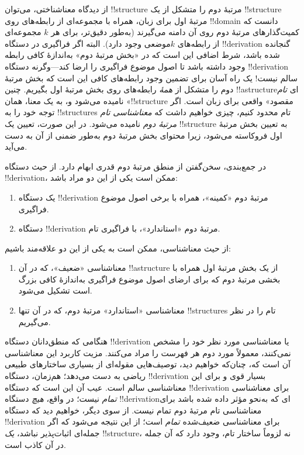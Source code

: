 \documentclass[../../../include/open-logic-section]{subfiles}
\begin{document}
از دیدگاه معناشناختی، می‌توان !!{structure} مرتبهٔ دوم را متشکل از یک
!!{structure} مرتبهٔ اول برای زبان، همراه با مجموعه‌ای از رابطه‌های روی
!!{domain} دانست که کمیت‌گذارهای مرتبهٔ دوم روی آن دامنه می‌گیرند
(به‌طور دقیق‌تر، برای هر $k$ مجموعه‌ای از رابطه‌های $k$موضعی وجود
دارد). البته اگر فراگیری در دستگاه !!{derivation} گنجانده شده باشد، شرط
اضافی این است که در «بخش مرتبهٔ دوم» به‌اندازهٔ کافی رابطه وجود داشته
باشد تا اصول موضوع فراگیری را ارضا کند---وگرنه دستگاه !!{derivation}
سالم نیست!{} یک راه آسان برای تضمین وجود رابطه‌های کافی این است که بخش
مرتبهٔ دوم را متشکل از \emph{همهٔ} رابطه‌های روی بخش مرتبهٔ اول بگیریم.
چنین !!a{structure}ای \emph{تام} نامیده می‌شود و، به یک معنا، همان
«!!{structure} مقصود» واقعی برای زبان است. اگر توجه خود را به
!!{structure}s تام محدود کنیم، چیزی خواهیم داشت که \emph{معناشناسی
تام مرتبهٔ دوم} نامیده می‌شود. در این صورت، تعیین یک !!{structure} به
تعیین بخش مرتبهٔ اول فروکاسته می‌شود، زیرا محتوای بخش مرتبهٔ دوم
به‌طور ضمنی از آن به دست می‌آید.

در جمع‌بندی، سخن‌گفتن از منطق مرتبهٔ دوم قدری ابهام دارد. از حیث دستگاه
!!{derivation}، ممکن است یکی از این دو مراد باشد:
\begin{enumerate}
\item یک دستگاه !!{derivation} مرتبهٔ دوم «کمینه»، همراه با برخی اصول
  موضوع فراگیری.
\item دستگاه !!{derivation} مرتبهٔ دوم «استاندارد»، با فراگیری تام.
\end{enumerate}
از حیث معناشناسی، ممکن است به یکی از این دو علاقه‌مند باشیم:
\begin{enumerate}
\item معناشناسی «ضعیف»، که در آن !!a{structure} از یک بخش مرتبهٔ اول
  همراه با بخشی مرتبهٔ دوم که برای ارضای اصول موضوع فراگیری به‌اندازهٔ
  کافی بزرگ است تشکیل می‌شود.
\item معناشناسی «استاندارد» مرتبهٔ دوم، که در آن تنها
  !!{structure}s تام را در نظر می‌گیریم.
\end{enumerate}
هنگامی که منطق‌دانان دستگاه !!{derivation} یا معناشناسی مورد نظر خود را
مشخص نمی‌کنند، معمولاً مورد دوم هر فهرست را مراد می‌کنند. مزیت کاربرد
این معناشناسی آن است که، چنان‌که خواهیم دید، توصیف‌هایی مقوله‌ای از
بسیاری ساختارهای طبیعی ریاضی به دست می‌دهد؛ هم‌زمان، دستگاه
!!{derivation} بسیار قوی و برای این معناشناسی سالم است. عیب آن این است
که دستگاه !!{derivation} برای معناشناسی \emph{تمام} نیست؛ در واقع،
\emph{هیچ} دستگاه !!{derivation}ای که به‌نحو مؤثر داده شده باشد برای
معناشناسی تام مرتبهٔ دوم تمام نیست. از سوی دیگر، خواهیم دید که دستگاه
!!{derivation} برای معناشناسی ضعیف‌شده \emph{تمام} است؛ از این نتیجه
می‌شود که اگر جمله‌ای اثبات‌پذیر نباشد، \emph{یک} !!{structure}، نه
لزوماً ساختار تام، وجود دارد که آن جمله در آن کاذب است.
\end{document}
